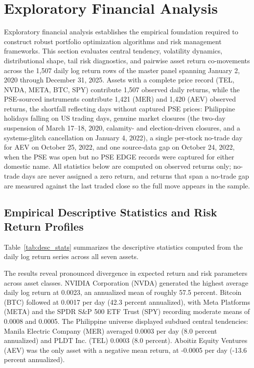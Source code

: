 \section{Exploratory Financial Analysis}

Exploratory financial analysis establishes the empirical foundation required to construct robust portfolio optimization algorithms and risk management frameworks. This section evaluates central tendency, volatility dynamics, distributional shape, tail risk diagnostics, and pairwise asset return co-movements across the 1,507 daily log return rows of the master panel spanning January 2, 2020 through December 31, 2025. Assets with a complete price record (TEL, NVDA, META, BTC, SPY) contribute 1,507 observed daily returns, while the PSE-sourced instruments contribute 1,421 (MER) and 1,420 (AEV) observed returns, the shortfall reflecting days without captured PSE prices: Philippine holidays falling on US trading days, genuine market closures (the two-day suspension of March 17--18, 2020, calamity- and election-driven closures, and a systems-glitch cancellation on January 4, 2022), a single per-stock no-trade day for AEV on October 25, 2022, and one source-data gap on October 24, 2022, when the PSE was open but no PSE EDGE records were captured for either domestic name. All statistics below are computed on observed returns only; no-trade days are never assigned a zero return, and returns that span a no-trade gap are measured against the last traded close so the full move appears in the sample.

\subsection{Empirical Descriptive Statistics and Risk Return Profiles}

Table~\ref{tab:desc_stats} summarizes the descriptive statistics computed from the daily log return series across all seven assets.



The results reveal pronounced divergence in expected return and risk parameters across asset classes. NVIDIA Corporation (NVDA) generated the highest average daily log return at 0.0023, an annualized mean of roughly 57.5 percent. Bitcoin (BTC) followed at 0.0017 per day (42.3 percent annualized), with Meta Platforms (META) and the SPDR S\&P 500 ETF Trust (SPY) recording moderate means of 0.0008 and 0.0005. The Philippine universe displayed subdued central tendencies: Manila Electric Company (MER) averaged 0.0003 per day (8.0 percent annualized) and PLDT Inc. (TEL) 0.0003 (8.0 percent). Aboitiz Equity Ventures (AEV) was the only asset with a negative mean return, at -0.0005 per day (-13.6 percent annualized).

